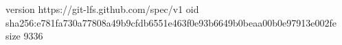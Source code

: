 version https://git-lfs.github.com/spec/v1
oid sha256:e781fa730a77808a49b9cfdb6551e463f0e93b6649b0beaa00b0e97913e002fe
size 9336
